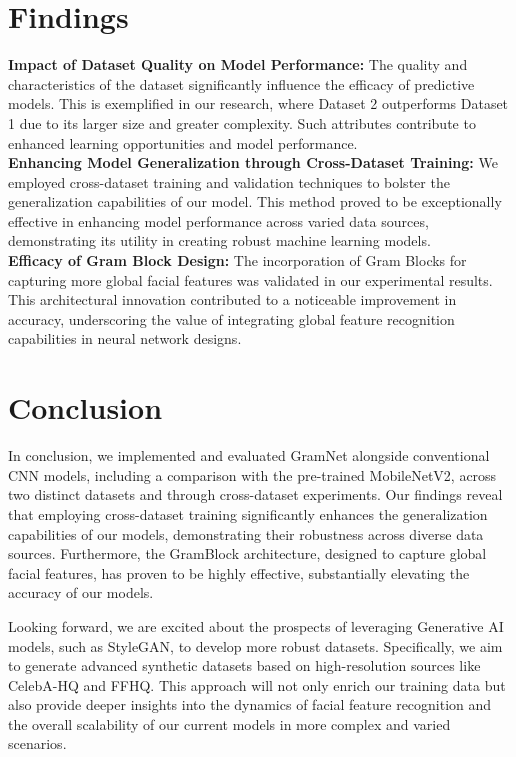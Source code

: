 \documentclass[rebuttal]{cvpr}
\begin{document}
\section{Findings}
\textbf{Impact of Dataset Quality on Model Performance:} The quality and characteristics of the dataset significantly influence the efficacy of predictive models. This is exemplified in our research, where Dataset 2 outperforms Dataset 1 due to its larger size and greater complexity. Such attributes contribute to enhanced learning opportunities and model performance.\\

\textbf{ Enhancing Model Generalization through Cross-Dataset Training:} We employed cross-dataset training and validation techniques to bolster the generalization capabilities of our model. This method proved to be exceptionally effective in enhancing model performance across varied data sources, demonstrating its utility in creating robust machine learning models.\\

\textbf{ Efficacy of Gram Block Design:} The incorporation of Gram Blocks for capturing more global facial features was validated in our experimental results. This architectural innovation contributed to a noticeable improvement in accuracy, underscoring the value of integrating global feature recognition capabilities in neural network designs.

\section{Conclusion}
In conclusion, we implemented and evaluated GramNet alongside conventional CNN models, including a comparison with the pre-trained MobileNetV2, across two distinct datasets and through cross-dataset experiments. Our findings reveal that employing cross-dataset training significantly enhances the generalization capabilities of our models, demonstrating their robustness across diverse data sources. Furthermore, the GramBlock architecture, designed to capture global facial features, has proven to be highly effective, substantially elevating the accuracy of our models.

Looking forward, we are excited about the prospects of leveraging Generative AI models, such as StyleGAN\cite{karras2019stylebased}, to develop more robust datasets. Specifically, we aim to generate advanced synthetic datasets based on high-resolution sources like CelebA-HQ and FFHQ. This approach will not only enrich our training data but also provide deeper insights into the dynamics of facial feature recognition and the overall scalability of our current models in more complex and varied scenarios.
\end{document}
